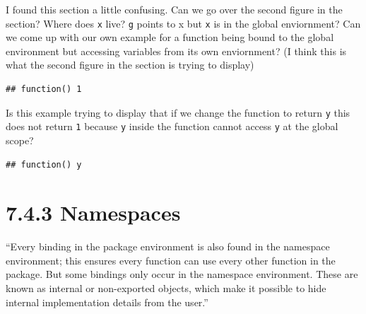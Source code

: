 \documentclass[]{book}
\newenvironment{Shaded}{\begin{snugshade}}{\end{snugshade}}
\newcommand{\ControlFlowTok}[1]{\textcolor[rgb]{0.13,0.29,0.53}{\textbf{#1}}}
\newcommand{\DecValTok}[1]{\textcolor[rgb]{0.00,0.00,0.81}{#1}}
\newcommand{\KeywordTok}[1]{\textcolor[rgb]{0.13,0.29,0.53}{\textbf{#1}}}
\newcommand{\NormalTok}[1]{#1}
\newcommand{\OperatorTok}[1]{\textcolor[rgb]{0.81,0.36,0.00}{\textbf{#1}}}
\newcommand{\StringTok}[1]{\textcolor[rgb]{0.31,0.60,0.02}{#1}}
\begin{document}
I found this section a little confusing. Can we go over the second figure in the section? Where does \texttt{x} live? \texttt{g} points to x but \texttt{x} is in the global enviornment? Can we come up with our own example for a function being bound to the global environment but accessing variables from its own enviornment? (I think this is what the second figure in the section is trying to display)

\begin{Shaded}
\end{Shaded}

\begin{verbatim}
## function() 1
\end{verbatim}

Is this example trying to display that if we change the function to return \texttt{y} this does not return \texttt{1} because \texttt{y} inside the function cannot access \texttt{y} at the global scope?

\begin{Shaded}
\end{Shaded}

\begin{verbatim}
## function() y
\end{verbatim}

\hypertarget{namespaces}{%
\section*{7.4.3 Namespaces}\label{namespaces}}

``Every binding in the package environment is also found in the namespace environment; this ensures every function can use every other function in the package. But some bindings only occur in the namespace environment. These are known as internal or non-exported objects, which make it possible to hide internal implementation details from the user.''
\end{document}
